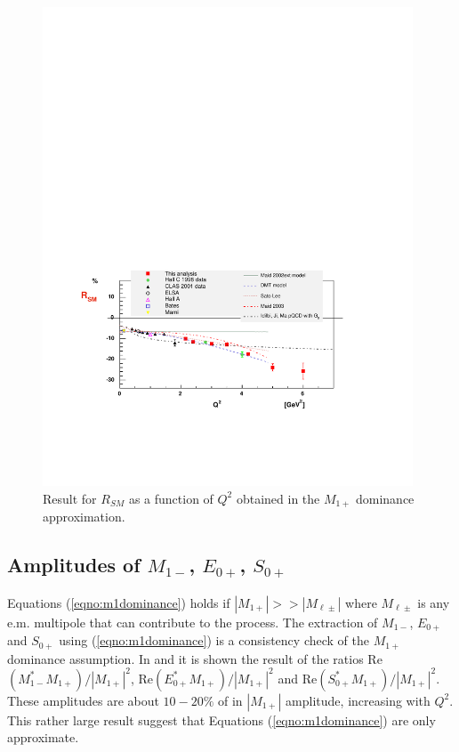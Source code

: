 \begin{figure}[h]
 \begin{center}
 \includegraphics[width = 11cm, bb=30 130 520 500]{analysis/img/RS} 
  \caption[Result for $R_{SM}$ as a function of $Q^2$]
          {  Result for $R_{SM}$ as a function of $Q^2$ obtained in the $M_{1+}$ dominance approximation.}
 \label{fig:SM}
\end{center}
\end{figure}

\cia
\subsection{Amplitudes of $M_{1-}$, $E_{0+}$, $S_{0+}$}
Equations  (\ref{eqno:m1dominance}) holds if $|M_{1+}| >> |M_{\ell\pm}|$ where $ M_{\ell\pm}$ is any 
e.m. multipole that can contribute to the process. The extraction of $M_{1-}$, $E_{0+}$ and $S_{0+}$
using (\ref{eqno:m1dominance}) is a consistency check of the  $M_{1+}$ dominance assumption.
In  and  it is shown the result of the ratios  Re$(M_{1-}^*M_{1+})/|M_{1+}|^2$, 
Re$(E_{0+}^*M_{1+})/|M_{1+}|^2$ and Re$(S_{0+}^*M_{1+})/|M_{1+}|^2$. These amplitudes are 
about $10-20 \% $ of in $|M_{1+}|$ amplitude, increasing with $Q^2$. This rather large result suggest that   
Equations  (\ref{eqno:m1dominance}) are only approximate.

